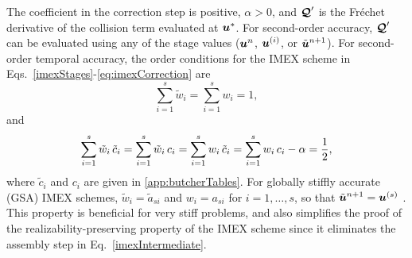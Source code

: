 The coefficient in the correction step is positive, $\alpha>0$, and $\boldsymbol{\mathcal{Q}}'$ is the Fr{\'e}chet derivative of the collision term evaluated at $\boldsymbol{u}^{*}$.  
For second-order accuracy, $\boldsymbol{\mathcal{Q}}'$ can be evaluated using any of the stage values ($\boldsymbol{u}^{n}$, $\boldsymbol{u}^{(i)}$, or $\tilde{\boldsymbol{u}}^{n+1}$).  
For second-order temporal accuracy, the order conditions for the IMEX scheme in Eqs.~\eqref{imexStages}-\eqref{eq:imexCorrection} are
\begin{equation}
  \sum_{i=1}^{s}\tilde{w}_{i}=\sum_{i=1}^{s}w_{i}=1,
  \label{orderConditions1}
\end{equation}
and
\begin{equation}
  \sum_{i=1}^{s}\tilde{w}_{i}\,\tilde{c}_{i}
  =\sum_{i=1}^{s}\tilde{w}_{i}\,c_{i}
  =\sum_{i=1}^{s}w_{i}\,\tilde{c}_{i}
  =\sum_{i=1}^{s}w_{i}\,c_{i}-\alpha=\frac{1}{2}, 
  \label{orderConditions2}
\end{equation}
where $\tilde{c}_{i}$ and $c_{i}$ are given in \ref{app:butcherTables}.  
For globally stiffly accurate (GSA) IMEX schemes, $\tilde{w}_{i}=\tilde{a}_{si}$ and $w_{i}=a_{si}$ for $i=1,\ldots,s$, so that $\tilde{\boldsymbol{u}}^{n+1}=\boldsymbol{u}^{(s)}$ \cite{ascher_etal_1997}.  
This property is beneficial for very stiff problems, and also simplifies the proof of the realizability-preserving property of the IMEX scheme since it eliminates the assembly step in Eq.~\eqref{imexIntermediate}.  

